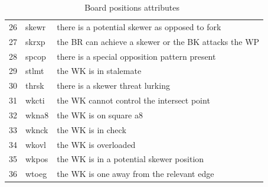 \documentclass[11pt]{article}
\begin{document}
\begin{table}[h]
{\begin{tabular}{|l|l|l|}
26	&skewr	&there is a potential skewer as opposed to fork \\
27	&skrxp	&the BR can achieve a skewer or the BK attacks the WP \\
28	&spcop	&there is a special opposition pattern present \\
29	&stlmt	&the WK is in stalemate \\
30	&thrsk	&there is a skewer threat lurking \\
31	&wkcti	&the WK cannot control the intersect point \\
32	&wkna8	&the WK is on square a8 \\
33	&wknck	&the WK is in check \\
34	&wkovl	&the WK is overloaded \\
35	&wkpos	&the WK is in a potential skewer position \\
36	&wtoeg	&the WK is one away from the relevant edge \\
\hline
\end{tabular}
}
\caption{Board positions attributes~\citep{Michie1995-MICCAA-2}}
\label{tab:attributes}
\end{table}

\clearpage


\end{document}
